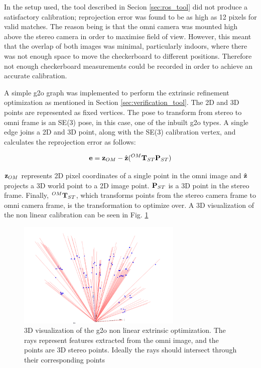 In the setup used, the tool described in Secion \ref{sec:ros_tool} did not produce a satisfactory calibration; reprojection error was found to be as high as 12 pixels for valid matches.  The reason being is that the omni camera was mounted high above the stereo camera in order to maximise field of view.  However, this meant that the overlap of both images was minimal, particularly indoors, where there was not enough space to move the checkerboard to different positions.  Therefore not enough checkerboard measurements could be recorded in order to achieve an accurate calibration.

A simple g2o graph was implemented to perform the extrinsic refinement optimization as mentioned in Section \ref{sec:verification_tool}.  The 2D and 3D points are represented as fixed vertices.  The pose to transform from stereo to omni frame is an SE(3) pose, in this case, one of the inbuilt g2o types.  A single edge joins a 2D and 3D point, along with the SE(3) calibration vertex, and calculates the reprojection error as follows:

\begin{align}
 \mathbf e = \mathbf z_{OM} - \hat{\mathbf z}( ^{OM}\mathbf T_{ST} \mathbf P_{ST})
\end{align}

$\mathbf z_{OM}$ represents 2D pixel coordinates of a single point in the omni image and $\hat{\mathbf z}$ projects a 3D world point to a 2D image point.  $\mathbf P_{ST}$ is a 3D point in the stereo frame. Finally, $^{OM}\mathbf T_{ST}$, which transforms points from the stereo camera frame to omni camera frame, is the transformation to optimize over.  A 3D visualization of the non linear calibration can be seen in Fig. \ref{fig:g2o_cal_vis}

\begin{figure}[h!]
  \centering
    \includegraphics[width=0.7\textwidth]{chapters/images/g2o_cal_vis}
  \caption{3D visualization of the g2o non linear extrinsic optimization.  The rays represent features extracted from the omni image, and the points are 3D stereo points.  Ideally the rays should intersect through their corresponding points}
  \label{fig:g2o_cal_vis}
\end{figure}

